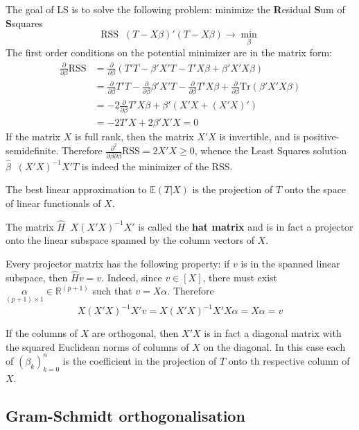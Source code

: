 \documentclass[a4paper]{article}
\newcommand{\clo}[1]{{\left [ #1 \right ]}}
\newcommand{\brac}[1]{{\left ( #1 \right )}}
\newcommand{\induc}[1]{{\left . #1 \right \vert}}
\newcommand{\Real}{\mathbb{R}}
\newcommand{\Ex}[0]{{\mathbb{E}}}
\newcommand{\RSS}{{\text{RSS}}}
\newcommand{\TR}{{\text{Tr}}}
\newcommand{\defn}{\mathop{\overset{\Delta}{=}}\nolimits}
\begin{document}
The goal of LS is to solve the following problem: minimize the \textbf{R}esidual \textbf{S}um of \textbf{S}squares
\[\RSS \defn \brac{T-X\beta}'\brac{T-X\beta} \to \min_\beta\]
The first order conditions on the potential minimizer are in the matrix form:
\begin{align*}
	\frac{\partial}{\partial \beta}\RSS &= \frac{\partial}{\partial \beta}\brac{T'T-\beta'X'T - T'X\beta + \beta'X'X\beta}\\
	&= \frac{\partial}{\partial \beta} T'T - \frac{\partial}{\partial \beta} \beta'X'T - \frac{\partial}{\partial \beta} T'X\beta + \frac{\partial}{\partial \beta} \TR\brac{\beta'X'X\beta}\\
	&= - 2 \frac{\partial}{\partial \beta} T'X\beta + \beta'\brac{X'X + \brac{X'X}'}\\
	&= - 2 T'X + 2 \beta'X'X = 0
\end{align*}
If the matrix $X$ is full rank, then the matrix $X'X$ is invertible, and is positive-semidefinite.
Therefore $\frac{\partial^2}{\partial \beta\partial \beta}\RSS = 2 X'X \geq 0$, whence the Least Squares solution $\hat{\beta} \defn \brac{X'X}^{-1} X'T$ is indeed the minimizer of the RSS.

The best linear approximation to $\Ex\brac{\induc{T}X}$ is the projection of $T$ onto the space of linear functionals of $X$.

The matrix $\hat{H} \defn X\brac{X'X}^{-1}X'$ is called the \textbf{hat matrix} and is in fact a projector onto the linear subspace spanned by the column vectors of $X$.

Every projector matrix has the following property: if $v$ is in the spanned linear subspace, then $\hat{H}v = v$.
Indeed, since $v\in \clo{X}$, there must exist $\underset{(p+1)\times 1}{\alpha}\in \Real^{(p+1)}$ such that $v = X\alpha$.
Therefore
\[X\brac{X'X}^{-1}X'v = X\brac{X'X}^{-1}X'X\alpha = X\alpha = v\]

If the columns of $X$ are orthogonal, then $X'X$ is in fact a diagonal matrix with the squared Euclidean norms of columns of $X$ on the diagonal.
In this case each of $\brac{\beta_k}_{k=0}^n$ is the coefficient in the projection of $T$ onto th respective column of $X$.


\subsection*{Gram-Schmidt orthogonalisation} %
\label{sub:gram_schmidt_orthogonalisation}
\end{document}
